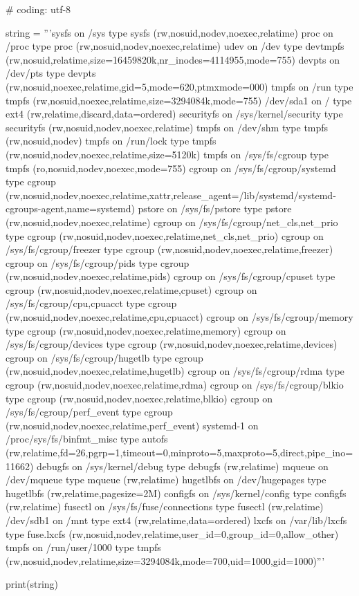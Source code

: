 \begin{mylisting}[label={lst:mount},language=sh,caption=mountコマンド]
# coding: utf-8

string = '''sysfs on /sys type sysfs (rw,nosuid,nodev,noexec,relatime)
proc on /proc type proc (rw,nosuid,nodev,noexec,relatime)
udev on /dev type devtmpfs (rw,nosuid,relatime,size=16459820k,nr_inodes=4114955,mode=755)
devpts on /dev/pts type devpts (rw,nosuid,noexec,relatime,gid=5,mode=620,ptmxmode=000)
tmpfs on /run type tmpfs (rw,nosuid,noexec,relatime,size=3294084k,mode=755)
/dev/sda1 on / type ext4 (rw,relatime,discard,data=ordered)
securityfs on /sys/kernel/security type securityfs (rw,nosuid,nodev,noexec,relatime)
tmpfs on /dev/shm type tmpfs (rw,nosuid,nodev)
tmpfs on /run/lock type tmpfs (rw,nosuid,nodev,noexec,relatime,size=5120k)
tmpfs on /sys/fs/cgroup type tmpfs (ro,nosuid,nodev,noexec,mode=755)
cgroup on /sys/fs/cgroup/systemd type cgroup (rw,nosuid,nodev,noexec,relatime,xattr,release_agent=/lib/systemd/systemd-cgroups-agent,name=systemd)
pstore on /sys/fs/pstore type pstore (rw,nosuid,nodev,noexec,relatime)
cgroup on /sys/fs/cgroup/net_cls,net_prio type cgroup (rw,nosuid,nodev,noexec,relatime,net_cls,net_prio)
cgroup on /sys/fs/cgroup/freezer type cgroup (rw,nosuid,nodev,noexec,relatime,freezer)
cgroup on /sys/fs/cgroup/pids type cgroup (rw,nosuid,nodev,noexec,relatime,pids)
cgroup on /sys/fs/cgroup/cpuset type cgroup (rw,nosuid,nodev,noexec,relatime,cpuset)
cgroup on /sys/fs/cgroup/cpu,cpuacct type cgroup (rw,nosuid,nodev,noexec,relatime,cpu,cpuacct)
cgroup on /sys/fs/cgroup/memory type cgroup (rw,nosuid,nodev,noexec,relatime,memory)
cgroup on /sys/fs/cgroup/devices type cgroup (rw,nosuid,nodev,noexec,relatime,devices)
cgroup on /sys/fs/cgroup/hugetlb type cgroup (rw,nosuid,nodev,noexec,relatime,hugetlb)
cgroup on /sys/fs/cgroup/rdma type cgroup (rw,nosuid,nodev,noexec,relatime,rdma)
cgroup on /sys/fs/cgroup/blkio type cgroup (rw,nosuid,nodev,noexec,relatime,blkio)
cgroup on /sys/fs/cgroup/perf_event type cgroup (rw,nosuid,nodev,noexec,relatime,perf_event)
systemd-1 on /proc/sys/fs/binfmt_misc type autofs (rw,relatime,fd=26,pgrp=1,timeout=0,minproto=5,maxproto=5,direct,pipe_ino=11662)
debugfs on /sys/kernel/debug type debugfs (rw,relatime)
mqueue on /dev/mqueue type mqueue (rw,relatime)
hugetlbfs on /dev/hugepages type hugetlbfs (rw,relatime,pagesize=2M)
configfs on /sys/kernel/config type configfs (rw,relatime)
fusectl on /sys/fs/fuse/connections type fusectl (rw,relatime)
/dev/sdb1 on /mnt type ext4 (rw,relatime,data=ordered)
lxcfs on /var/lib/lxcfs type fuse.lxcfs (rw,nosuid,nodev,relatime,user_id=0,group_id=0,allow_other)
tmpfs on /run/user/1000 type tmpfs (rw,nosuid,nodev,relatime,size=3294084k,mode=700,uid=1000,gid=1000)'''

print(string)
\end{mylisting}

